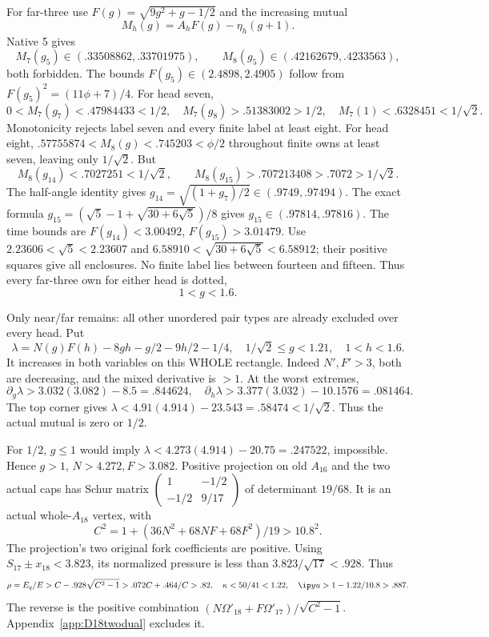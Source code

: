 For far-three use \(F(g)=\sqrt{9g^2+g-1/2}\) and the increasing
mutual
\[
                 M_h(g)=A_hF(g)-\eta_h(g+1).
\]
Native 5 gives
\[
 M_7(g_5)\in(.33508862,.33701975),\qquad
 M_8(g_5)\in(.42162679,.4233563),
\]
both forbidden.
The bounds \(F(g_5)\in(2.4898,2.4905)\) follow from
\(F(g_5)^2=(11\phi+7)/4\).
For head seven,
\[
 0<M_7(g_7)<.47984433<1/2,\quad
 M_7(g_8)>.51383002>1/2,\quad
 M_7(1)<.6328451<1/\sqrt2 .
\]
Monotonicity rejects label seven and every finite label at least eight.
For head eight,
\(.57755874<M_8(g)<.745203<\phi/2\) throughout finite
owns at least seven, leaving only \(1/\sqrt2\).
But
\[
 M_8(g_{14})<.7027251<1/\sqrt2,\qquad
 M_8(g_{15})>.707213408>.7072>1/\sqrt2 .
\]
The half-angle identity gives \(g_{14}=\sqrt{(1+g_7)/2}
\in(.9749,.97494)\).
The exact formula
\(g_{15}=(\sqrt5-1+\sqrt{30+6\sqrt5})/8\)
gives \(g_{15}\in(.97814,.97816)\).
The time bounds are \(F(g_{14})<3.00492\),
\(F(g_{15})>3.01479\).
Use \(2.23606<\sqrt5<2.23607\) and
\(6.58910<\sqrt{30+6\sqrt5}<6.58912\);
their positive squares give all enclosures.
No finite label lies between fourteen and fifteen.
Thus every far-three own for either head is dotted,
\[
                              1<g<1.6 .
\]

Only near/far remains: all other unordered pair types are already
excluded over every head.
Put
\[
 \lambda=N(g)F(h)-8gh-g/2-9h/2-1/4,\quad
 1/\sqrt2\le g<1.21,\quad1<h<1.6 .
\]
It increases in both variables on this WHOLE rectangle.
Indeed \(N',F'>3\), both are decreasing, and the mixed
derivative is \(>1\).
At the worst extremes,
\[
 \partial_g\lambda>3.032(3.082)-8.5=.844624,\quad
 \partial_h\lambda>3.377(3.032)-10.1576=.081464 .
\]
The top corner gives
\(\lambda<4.91(4.914)-23.543=.58474<1/\sqrt2\).
Thus the actual mutual is zero or \(1/2\).

For \(1/2\), \(g\le1\) would imply
\(\lambda<4.273(4.914)-20.75=.247522\), impossible.
Hence \(g>1\), \(N>4.272,F>3.082\).
Positive projection on old \(A_{16}\) and the two actual caps
has Schur matrix
\(\left(\begin{smallmatrix}1&-1/2\\-1/2&9/17\end{smallmatrix}\right)\)
of determinant \(19/68\).
It is an actual whole-\(A_{18}\) vertex, with
\[
 C^2=1+(36N^2+68NF+68F^2)/19>10.8^2.
\]
The projection's two original fork coefficients are positive.
Using \(S_{17}\pm x_{18}<3.823\), its normalized pressure is
less than \(3.823/\sqrt{17}<.928\).
Thus
\[
 \rho=E_q/E>C-.928\sqrt{C^2-1}
                 >.072C+.464/C>.82,
 \quad\kappa<50/41<1.22,
 \quad\ip yu>1-1.22/10.8>.887 .
\]
The reverse is the positive combination
\((N\Omega'_{18}+F\Omega'_{17})/\sqrt{C^2-1}\).
Appendix~\ref{app:D18twodual} excludes it.

